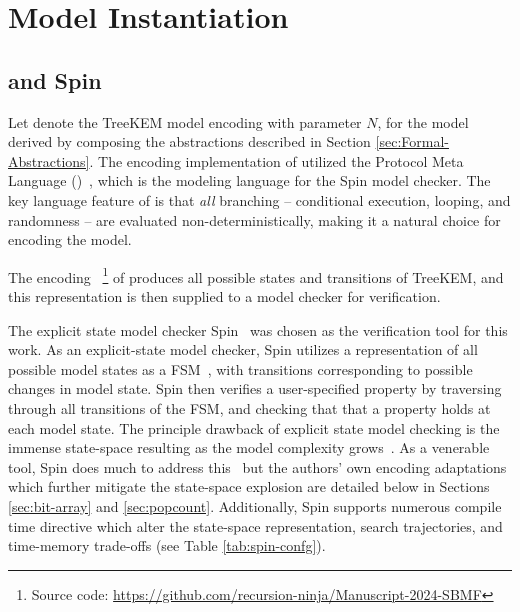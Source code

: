 \documentclass[runningheads]{llncs}
\newcommand{\Abrev}[1]{\gls{#1}}
\begin{document}
\section{Model Instantiation}

\subsection{\Promela and Spin}

\newcommand\dblwrr{\wr\mkern-2mu\wr}

Let  denote the TreeKEM model encoding with parameter $N$, for the model derived by composing the abstractions described in Section \ref{sec:Formal-Abstractions}.
The encoding implementation of  utilized the Protocol Meta Language (\Promela)~\cite{HolzmannSpinBook2003}, 
which is the modeling language for the Spin model checker. 
The key language feature of \Promela is that \emph{all} branching -- conditional execution, looping, and randomness -- are evaluated non-deterministically, making it a natural choice for encoding the model.

The \Promela encoding~\cite{WashburnModelSPIN2024} \footnote{Source code: \url{https://github.com/recursion-ninja/Manuscript-2024-SBMF}} of  produces all possible states and transitions of TreeKEM, and this representation is then supplied to a model checker for verification.


The explicit state model checker Spin~\cite{HolzmannSpinBook2003} was chosen as the verification tool for this work.
As an explicit-state model checker, Spin utilizes a representation of all possible model states as a \Abrev{FSM}~\cite{clarke1981design}, with transitions corresponding to possible changes in model state.
Spin then verifies a user-specified property by traversing through all transitions of the \Abrev{FSM}, and checking that that a property holds at each model state.
The principle drawback of explicit state model checking is the immense state-space resulting as the model complexity grows~\cite{burch1992symbolic}.
As a venerable tool, Spin does much to address this~\cite{rudin1987limits} but the authors' own encoding adaptations which further mitigate the state-space explosion are detailed below in Sections \ref{sec:bit-array} and \ref{sec:popcount}.
Additionally, Spin supports numerous compile time directive which alter the state-space representation, search trajectories, and time-memory trade-offs (see Table \ref{tab:spin-confg}).
\end{document}
